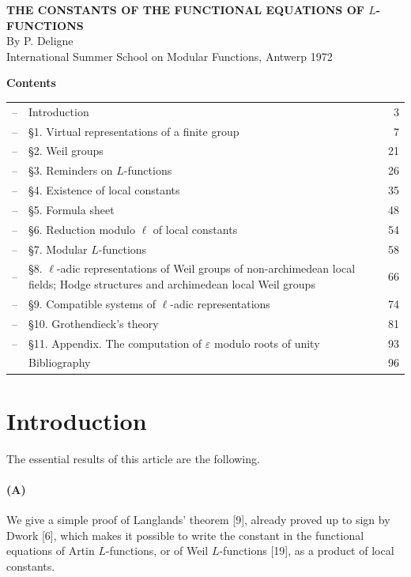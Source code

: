 \documentclass[10pt]{article}
\begin{document}
\begin{center}
{\Large\bfseries THE CONSTANTS OF THE FUNCTIONAL EQUATIONS OF \(L\)-FUNCTIONS}\\[2em]
{\large By P. Deligne}\\[6em]
International Summer School on Modular Functions, Antwerp 1972
\end{center}

\newpage

\begin{center}
\bfseries Contents
\end{center}

\noindent\begin{tabularx}{\textwidth}{@{}p{}Xr@{}}
--& Introduction & 3\\
--& \S1. Virtual representations of a finite group & 7\\
--& \S2. Weil groups & 21\\
--& \S3. Reminders on \(L\)-functions & 26\\
--& \S4. Existence of local constants & 35\\
--& \S5. Formula sheet & 48\\
--& \S6. Reduction modulo \(\ell\) of local constants & 54\\
--& \S7. Modular \(L\)-functions & 58\\
--& \S8. \(\ell\)-adic representations of Weil groups of non-archimedean local fields; Hodge structures and archimedean local Weil groups & 66\\
--& \S9. Compatible systems of \(\ell\)-adic representations & 74\\
--& \S10. Grothendieck's theory & 81\\
--& \S11. Appendix. The computation of \(\varepsilon\) modulo roots of unity & 93\\
& Bibliography & 96
\end{tabularx}

\newpage

\section*{Introduction}

The essential results of this article are the following.

\paragraph{(A)} We give a simple proof of Langlands' theorem [9], already proved up to sign by Dwork [6], which makes it possible to write the constant in the functional equations of Artin \(L\)-functions, or of Weil \(L\)-functions [19], as a product of local constants.
\end{document}
